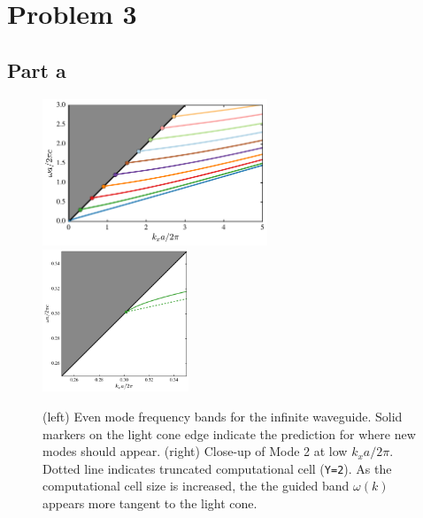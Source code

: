 \documentclass[aps,letterpaper,10pt]{article}
\begin{document}
\section{Problem 3}

\subsection{Part a}
\begin{figure}[!h]
\centering
\includegraphics[width=0.6\textwidth]{3a-1}
\includegraphics[width=0.39\textwidth]{3a-2}
\caption{\label{fig:3a} (left) Even mode frequency bands for the infinite waveguide. Solid markers on the light cone edge indicate the prediction for where new modes should appear. (right) Close-up of Mode 2 at low $k_x a/2\pi$. Dotted line indicates truncated computational cell (\texttt{Y=2}). As the computational cell size is increased, the the guided band $\omega(k)$ appears more tangent to the light cone. }
\end{figure}
\end{document}
